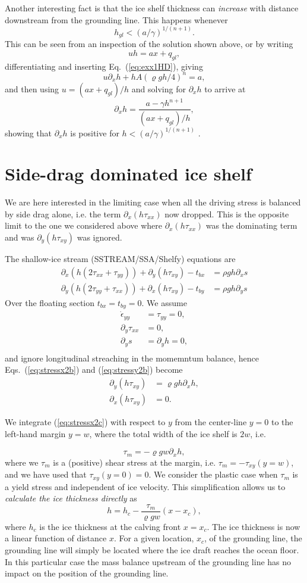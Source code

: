 \documentclass[10pt,a4paper]{book}
\newcommand{\p}{\partial}
\newcommand{\eyy}{\dot{\epsilon}_{yy}}
\newcommand{\tbx}{t_{bx}}
\newcommand{\tby}{t_{by}}
\newcommand{\txx}{\tau_{xx}}
\newcommand{\tyy}{\tau_{yy}}
\newcommand{\txy}{\tau_{xy}}
\begin{document}
Another interesting fact is that the ice shelf thickness can {\em increase}
with distance downstream from the grounding line. This happens whenever
\[
h_{gl} < (a/\gamma)^{1/(n+1)} .
\]
This can be seen from an inspection of the solution shown above, or by writing
\[
u h= a x + q_{gl} ,
\]
differentiating and inserting Eq.~(\ref{eq:exx1HD}), giving
\[
u \p_x h + h A (\varrho g h/4)^n  = a ,
\]
and then using $u=(a x+ q_{gl})/h$ and solving for $\p_x h$ to arrive at
\[
\p_x h = \frac{a - \gamma h^{n+1}}{(a x + q_{gl})/h},
\]
showing that $\p_x h$ is positive for $h < (a/\gamma)^{1/(n+1)}$ .


\section{Side-drag dominated ice shelf}

We are here interested in the limiting case when all the driving
stress is balanced by side drag alone, i.e. the term $\p_x ( h \txx)$
now dropped. This is the opposite limit to the one we considered above
where $\p_x ( h \txx)$ was the dominating term and was
$\p_y (h \txy)$  was ignored.

The shallow-ice stream (SSTREAM/SSA/Shelfy) equations are
\begin{align} 
\p_x ( h ( 2 \txx + \tyy)) +\p_y ( h \txy) - \tbx
&=\rho g h \p_x s 
\label{eq:stressx2b}\\
\p_y (  h ( 2 \tyy + \txx)) +\p_x ( h \txy ) - \tby
&= \rho g h \p_y s 
\label{eq:stressy2b}
\end{align}
Over the floating section $\tbx=\tby=0$.  We assume
\begin{align*}
\eyy   &=\tyy=0, \\
\p_y \txx&=0, \\
\p_y s &= \p_y h =0, \\
\end{align*}
and ignore longitudinal streaching in the momemntum balance,
hence Eqs.~(\ref{eq:stressx2b}) and (\ref{eq:stressy2b}) become
\begin{align} 
\p_y  ( h \txy)   &= \varrho g h \p_x h, \label{eq:stressx2c}\\
\p_x ( h \txy )  &= 0.  \label{eq:stressy2c}
\end{align}

We integrate (\ref{eq:stressx2c}) with respect to $y$ from the center-line $y=0$ to the
left-hand margin $y=w$, where the total width of the ice shelf is $2w$, i.e.

\[
\tau_m = -\varrho g w \p_x h,
\]
where we $\tau_m$ is a (positive) shear stress at the margin,
i.e. $\tau_m=-\txy(y=w)$, and we have used that $\txy(y=0)=0$. We
consider the plastic case when $\tau_m$ is a yield stress and
independent of ice velocity. This simplification allows us to
{\em calculate the ice thickness directly} as
\[
h= h_c- \frac{\tau_m}{\varrho g w} (x-x_c),
\]
where $h_c$ is the ice thickness at the calving front $x=x_c$. The ice
thickness is now a linear function of distance $x$. For a given
location, $x_c$, of the grounding line, the grounding line will simply
be located where the ice draft reaches the ocean floor. In this
particular case the mass balance upstream of the grounding line has no
impact on the position of the grounding line.
\end{document}
